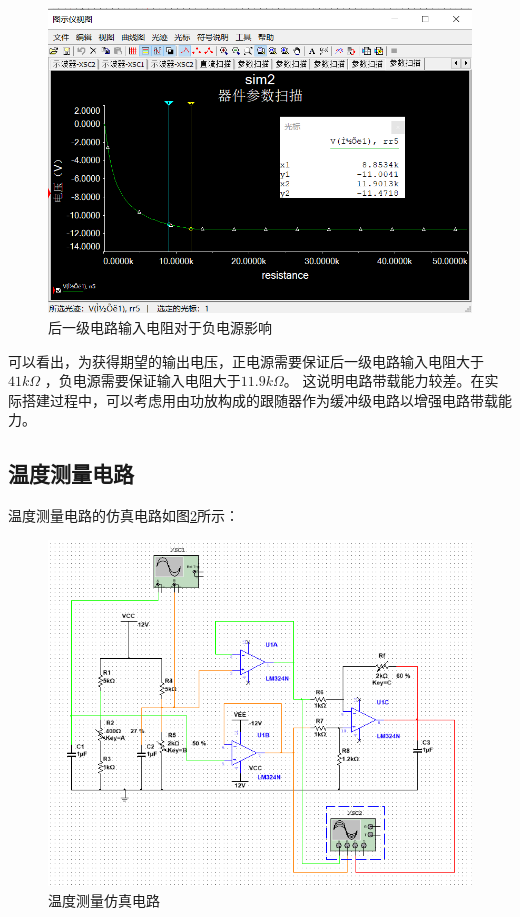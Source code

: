 \documentclass{article}
\begin{document}
\begin{spacing}{1.5}
    \begin{figure}[H]
        \centering
        \includegraphics[scale=0.4]{fig/sim/sim2_result5.png}
        \caption{后一级电路输入电阻对于负电源影响}
        \label{fig:sim2_result5}
    \end{figure}
    
    可以看出，为获得期望的输出电压，正电源需要保证后一级电路输入电阻大于$41k\Omega$ ，负电源需要保证输入电阻大于$11.9k\Omega$。
    这说明电路带载能力较差。在实际搭建过程中，可以考虑用由功放构成的跟随器作为缓冲级电路以增强电路带载能力。

    \subsection{温度测量电路}

    温度测量电路的仿真电路如图\ref{fig:sim3}所示：
    \begin{figure}[H]
        \centering
        \includegraphics[scale=0.4]{fig/sim/sim3.png}
        \caption{温度测量仿真电路}
        \label{fig:sim3}
    \end{figure}
    

\end{spacing}
\end{document}
